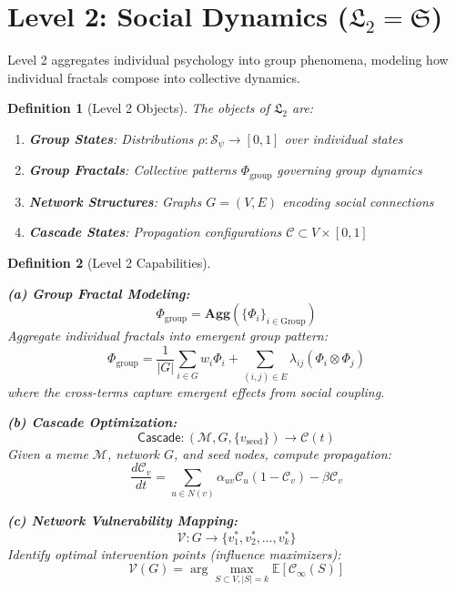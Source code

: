 \documentclass[11pt,twoside]{book}
\newcommand{\Frac}{\Phi}
\newcommand{\Level}[1]{\mathfrak{L}_{#1}}
\newcommand{\Social}{\mathfrak{S}}
\newcommand{\GroupFrac}{\Phi_{\mathrm{group}}}
\newcommand{\Memetic}{\mathcal{M}}
\newcommand{\Vulnerability}{\mathcal{V}}
\newcommand{\Cascade}{\mathcal{C}}
\newtheorem{definition}{Definition}[chapter]
\begin{document}
\section{Level 2: Social Dynamics ($\Level{2} = \Social$)}

Level 2 aggregates individual psychology into group phenomena, modeling how
individual fractals compose into collective dynamics.

\begin{definition}[Level 2 Objects]
\label{def:L2-objects}
The objects of $\Level{2}$ are:
\begin{enumerate}[label=(\alph*)]
    \item \textbf{Group States}: Distributions $\rho : \mathcal{S}_\psi \to [0,1]$ over
          individual states
    \item \textbf{Group Fractals}: Collective patterns $\GroupFrac$ governing group dynamics
    \item \textbf{Network Structures}: Graphs $G = (V, E)$ encoding social connections
    \item \textbf{Cascade States}: Propagation configurations $\Cascade \subset V \times [0,1]$
\end{enumerate}
\end{definition}

\begin{definition}[Level 2 Capabilities]
\label{def:L2-capabilities}

\textbf{(a) Group Fractal Modeling:}
\begin{equation}
\boxed{
    \GroupFrac = \mathbf{Agg}\left(\{\Frac_i\}_{i \in \mathrm{Group}}\right)
}
\end{equation}
Aggregate individual fractals into emergent group pattern:
\[
    \GroupFrac = \frac{1}{|G|} \sum_{i \in G} w_i \Frac_i +
    \sum_{(i,j) \in E} \lambda_{ij} (\Frac_i \otimes \Frac_j)
\]
where the cross-terms capture emergent effects from social coupling.

\textbf{(b) Cascade Optimization:}
\begin{equation}
\boxed{
    \mathsf{Cascade} : (\Memetic, G, \{v_{\mathrm{seed}}\}) \to \Cascade(t)
}
\end{equation}
Given a meme $\Memetic$, network $G$, and seed nodes, compute propagation:
\[
    \frac{d\Cascade_v}{dt} = \sum_{u \in N(v)} \alpha_{uv} \Cascade_u (1 - \Cascade_v)
    - \beta \Cascade_v
\]

\textbf{(c) Network Vulnerability Mapping:}
\begin{equation}
\boxed{
    \Vulnerability : G \to \{v_1^*, v_2^*, \ldots, v_k^*\}
}
\end{equation}
Identify optimal intervention points (influence maximizers):
\[
    \Vulnerability(G) = \arg\max_{S \subset V, |S| = k} \mathbb{E}[\Cascade_{\infty}(S)]
\]
\end{definition}
\end{document}
